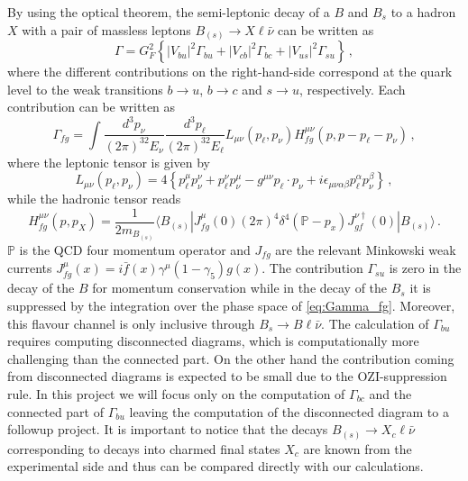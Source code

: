 By using the optical theorem, the semi-leptonic decay of a $B$ and $B_s$
to a hadron $X$ with a pair of massless leptons $B_{(s)} \to X\ell\bar\nu$ can be written as
\begin{equation}
  \Gamma = G^2_F\left\{ |V_{bu} |^2 \Gamma_{bu} + |V_{cb} |^2 \Gamma_{bc} + |V_{us} |^2 \Gamma_{su}
  \right\}\,,
\end{equation}
where the different contributions on the right-hand-side correspond at the quark level
to the weak transitions $b \to u$, $b \to c$ and $s \to u$, respectively.
Each contribution can be written as
\begin{equation}\label{eq:Gamma_fg}
  \Gamma_{fg}=\int \frac{d^3p_\nu}{(2\pi)^32E_\nu}\frac{d^3p_\ell}{(2\pi)^32E_\ell}
  L_{\mu\nu}(p_\ell, p_\nu) H^{\mu\nu}_{fg}(p,p-p_\ell-p_\nu)\,,
\end{equation}
where the leptonic tensor is given by
\begin{equation}
  L_{\mu\nu}(p_\ell, p_\nu) =4\left\{p_\ell^\mu p_\nu^\nu +p_\ell^\nu
  p_\nu^\mu - g^{\mu\nu} p_\ell\cdot p_\nu+
  i\epsilon_{\mu\nu\alpha\beta} p_\ell^\alpha p_\nu^\beta\right\}\,,
\end{equation}
while the hadronic tensor reads
\begin{equation}
  H^{\mu\nu}_{fg}(p,p_X)=\frac{1}{2m_{B_{(s)}}}\langle B_{(s)}| J^\mu_{fg}(0)(2\pi)^4
  \delta^4(\mathbb{P}-p_x) J^{\nu\dagger}_{gf} (0)| B_{(s)}\rangle\,.
\end{equation}
$\mathbb{P}$ is the QCD four momentum operator and $J_{fg}$ are the
relevant Minkowski weak currents $J_{fg}^\mu(x)=i\bar
  f(x)\gamma^\mu(1-\gamma_5)g(x)$.
The contribution $\Gamma_{su}$ is zero in the decay of the $B$ for
momentum conservation while  in the decay of the $B_{s}$ it is
suppressed by the integration over the phase space of
\eqref{eq:Gamma_fg}. Moreover, this flavour channel is only inclusive
through $B_s\to B\ell\bar\nu$. 
The calculation of $\Gamma_{bu}$  requires computing disconnected
diagrams, which is computationally more challenging than the connected
part. 
On the other hand the contribution coming from disconnected diagrams
is expected to be small due to the OZI-suppression rule. 
In this project we will focus only on the computation of $\Gamma_{bc}$
and the connected part of $\Gamma_{bu}$ leaving the computation of the
disconnected diagram to a followup project. 
It is important to notice that the decays $B_{(s)} \to X_c\ell\bar\nu$ corresponding to decays into charmed final states $X_c$ are known from the experimental side and thus can be compared directly with our calculations.

